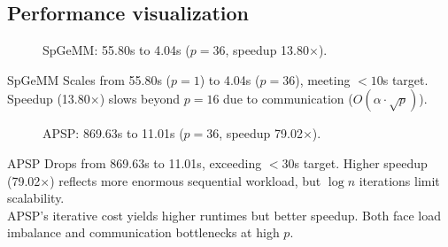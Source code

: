 \documentclass[11pt]{article}
\begin{document}
\subsection{Performance visualization}

\begin{figure}[H]
    \centering
    \caption{\color{black}SpGeMM: 55.80s to 4.04s ($p=36$, speedup 13.80$\times$).}
\end{figure}

SpGeMM Scales from {\color{black}55.80s ($p=1$)} to {\color{black}4.04s ($p=36$)}, meeting $<10$s target. Speedup ({\color{black}13.80$\times$}) slows beyond $p=16$ due to communication ($O(\alpha \cdot \sqrt{p})$). 
 
\begin{figure}[H]
    \centering
    \caption{\color{black}APSP: 869.63s to 11.01s ($p=36$, speedup 79.02$\times$).}
\end{figure}

APSP Drops from {\color{black}869.63s} to {\color{black}11.01s}, exceeding $<30$s target. Higher speedup ({\color{black}79.02$\times$}) reflects more enormous sequential workload, but $\log n$ iterations limit scalability.\\ 

APSP’s iterative cost yields higher runtimes but better speedup. 
Both face load imbalance and communication bottlenecks at high $p$.

\end{document}
